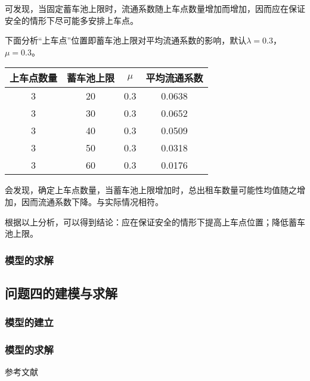 \documentclass[withoutpreface,bwprint]{cumcmthesis} %
\begin{document}
可发现，当固定蓄车池上限时，流通系数随上车点数量增加而增加，因而应在保证安全的情形下尽可能多安排上车点。

下面分析“上车点”位置即蓄车池上限对平均流通系数的影响，默认$\lambda=0.3$，$\mu=0.3$。
\begin{center}
	\begin{tabular}{cccc}
		\hline
		上车点数量 & 蓄车池上限 & $\mu$ & 平均流通系数 \\
		\hline
		3          & 20         & 0.3   & 0.0638       \\
		3          & 30         & 0.3   & 0.0652       \\
		3          & 40         & 0.3   & 0.0509       \\
		3          & 50         & 0.3   & 0.0318       \\
		3          & 60         & 0.3   & 0.0176       \\
		\hline
	\end{tabular}
\end{center}

会发现，确定上车点数量，当蓄车池上限增加时，总出租车数量可能性均值随之增加，因而流通系数下降。与实际情况相符。

根据以上分析，可以得到结论：应在保证安全的情形下提高上车点位置；降低蓄车池上限。

\subsubsection{模型的求解}



\newpage
\subsection{问题四的建模与求解}
\subsubsection{模型的建立}


\subsubsection{模型的求解}

\newpage
\begin{thebibliography}{9} %
	 参考文献
\end{thebibliography}
\end{document}
